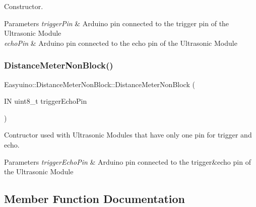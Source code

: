Constructor. 


\begin{DoxyParams}{Parameters}
{\em trigger\+Pin} & Arduino pin connected to the trigger pin of the Ultrasonic Module \\
\hline
{\em echo\+Pin} & Arduino pin connected to the echo pin of the Ultrasonic Module \\
\hline
\end{DoxyParams}
\mbox{\label{class_easyuino_1_1_distance_meter_non_block_af77c0f4649ea521a5b75c457b6762db2}} 
\subsubsection{\texorpdfstring{Distance\+Meter\+Non\+Block()}{DistanceMeterNonBlock()}\hspace{0.1cm}{\footnotesize\ttfamily [2/2]}}
{\footnotesize\ttfamily Easyuino\+::\+Distance\+Meter\+Non\+Block\+::\+Distance\+Meter\+Non\+Block (\begin{DoxyParamCaption}\item[{IN uint8\+\_\+t}]{trigger\+Echo\+Pin }\end{DoxyParamCaption})}



Contructor used with Ultrasonic Modules that have only one pin for trigger and echo. 


\begin{DoxyParams}{Parameters}
{\em trigger\+Echo\+Pin} & Arduino pin connected to the trigger\&echo pin of the Ultrasonic Module \\
\hline
\end{DoxyParams}


\subsection{Member Function Documentation}
\mbox{\label{class_easyuino_1_1_distance_meter_non_block_a46d2093d0fc125e98c3602868c088a77}} 
